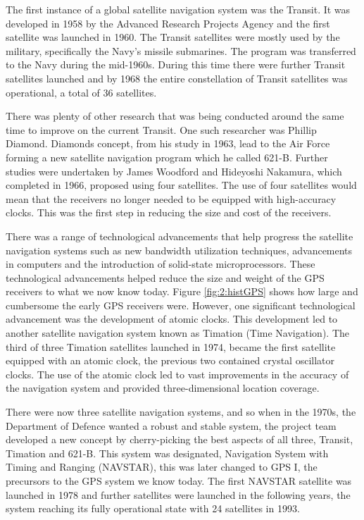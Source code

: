 \vspace{0.6cm}
The first instance of a global satellite navigation system was the Transit. It was developed in 1958 by the Advanced Research Projects Agency and the first satellite was launched in 1960. The Transit satellites were mostly used by the military, specifically the Navy's missile submarines. The program was transferred to the Navy during the mid-1960s. During this time there were further Transit satellites launched and by 1968 the entire constellation of Transit satellites was operational, a total of 36 satellites. \cite{Aerospace2021}\par
\vspace{0.6cm}
There was plenty of other research that was being conducted around the same time to improve on the current Transit. One such researcher was Phillip Diamond. Diamonds concept, from his study in 1963, lead to the Air Force forming a new satellite navigation program which he called 621-B. Further studies were undertaken by James Woodford and Hideyoshi Nakamura, which completed in 1966, proposed using four satellites. The use of four satellites would mean that the receivers no longer needed to be equipped with high-accuracy clocks. This was the first step in reducing the size and cost of the receivers. \cite{Aerospace2021} \par
\vspace{0.6cm}
There was a range of technological advancements that help progress the satellite navigation systems such as new bandwidth utilization techniques, advancements in computers and the introduction of solid-state microprocessors. These technological advancements helped reduce the size and weight of the GPS receivers to what we now know today. Figure \ref{fig:2:histGPS} shows how large and cumbersome the early GPS receivers were. However, one significant technological advancement was the development of atomic clocks. This development led to another satellite navigation system known as Timation (Time Navigation). The third of three Timation satellites launched in 1974, became the first satellite equipped with an atomic clock, the previous two contained crystal oscillator clocks. The use of the atomic clock led to vast improvements in the accuracy of the navigation system and provided three-dimensional location coverage. \cite{Aerospace2021} \par
\vspace{0.6cm}
There were now three satellite navigation systems, and so when in the 1970s, the Department of Defence wanted a robust and stable system, the project team developed a new concept by cherry-picking the best aspects of all three, Transit, Timation and 621-B. This system was designated, Navigation System with Timing and Ranging (NAVSTAR), this was later changed to GPS I, the precursors to the GPS system we know today. The first NAVSTAR satellite was launched in 1978 and further satellites were launched in the following years, the system reaching its fully operational state with 24 satellites in 1993. \cite{Mai2017}\par
